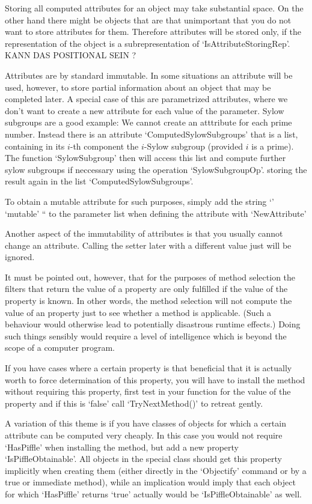 \danger
Storing all computed attributes for an object may take substantial space. On
the other hand there might be objects that are that unimportant that you
do not want to store attributes for them. Therefore attributes will be
stored only, if the representation of the object is a subrepresentation of
`IsAttributeStoringRep'. KANN DAS POSITIONAL SEIN ?

\danger
Attributes are by standard immutable. In some situations an attribute will
be used, however, to store partial information about an object that may be
completed later. A special case of this are parametrized attributes, where
we don't want to create a new attribute for each value of the parameter.
Sylow subgroups are a good example: We cannot create an atttribute for each
prime number. Instead there is an attribute `ComputedSylowSubgroups' that is
a list, containing in its $i$-th component the $i$-Sylow subgroup (provided
$i$ is a prime). The function `SylowSubgroup' then will access this list and
compute further sylow subgroups if neccessary using the operation
`SylowSubgroupOp'. storing the result again in the list
`ComputedSylowSubgroups'.

\danger
To obtain a mutable attribute for such purposes, simply add the string 
`' `mutable' `` to the parameter list when defining the attribute with
`NewAttribute'

\danger
Another aspect of the immutability of attributes is that you usually cannot
change an attribute. Calling the setter later with a different value just
will be ignored.


\danger
It must be pointed out, however, that for the purposes of method selection
the filters that return the value of a property are only fulfilled if the
value of the property is known. In other words, the method selection will
not compute the value of an property just to see whether a method is
applicable. (Such a behaviour would otherwise lead to potentially disastrous
runtime effects.) Doing such things sensibly would require a level of
intelligence which is beyond the scope of a computer program. 

\danger
If you have cases where a certain property is that beneficial that
it is actually worth to force determination of this property, you will have
to install the method without requiring this property, first test in your
function for the value of the property and if this is `false' call
`TryNextMethod()' to retreat gently.

\danger
A variation of this theme is if you have classes of objects for which
a certain attribute can be computed very cheaply. In this case you would not
require `HasPiffle' when installing the method, but add a new property
`IsPiffleObtainable'. All objects in the special class should get this
property implicitly when creating them (either directly in the `Objectify'
command or by a true or immediate method), while an implication would imply
that each object for which `HasPiffle' returns `true' actually would be
`IsPiffleObtainable' as well.

